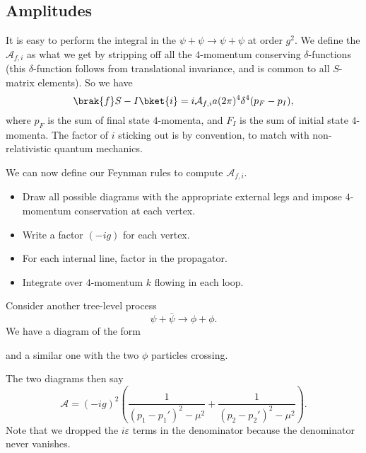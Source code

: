 \documentclass[a4paper]{article}
\begin{document}
\subsection{Amplitudes}
It is easy to perform the integral in the $\psi + \psi \to \psi + \psi$ at order $g^2$. We define the  $\mathcal{A}_{f,i}$ as what we get by stripping off all the $4$-momentum conserving $\delta$-functions (this $\delta$-function follows from translational invariance, and is common to all $S$-matrix elements). So we have
\[
  \brak{f}S - I\bket{i} = i \mathcal{A}_{f,i}a (2\pi)^4 \delta^4 (p_F - p_I),
\]
where $p_F$ is the sum of final state $4$-momenta, and $F_I$ is the sum of initial state $4$-momenta. The factor of $i$ sticking out is by convention, to match with non-relativistic quantum mechanics.

We can now define our Feynman rules to compute $\mathcal{A}_{f, i}$.

\begin{itemize}
  \item Draw all possible diagrams with the appropriate external legs and impose $4$-momentum conservation at each vertex.
  \item Write a factor $(-ig)$ for each vertex.
  \item For each internal line, factor in the propagator.
  \item Integrate over $4$-momentum $k$ flowing in each loop.
\end{itemize}

\begin{eg}
  Consider another tree-level process
  \[
    \psi + \bar{\psi} \to \phi + \phi.
  \]
  We have a diagram of the form
  \begin{center}
  \end{center}
  and a similar one with the two $\phi$ particles crossing.

  The two diagrams then say
  \[
    \mathcal{A} = (-ig)^2 \left(\frac{1}{(p_1 - p_1')^2 - \mu^2} + \frac{1}{(p_2 - p_2')^2 - \mu^2}\right).
  \]
  Note that we dropped the $i\varepsilon$ terms in the denominator because the denominator never vanishes.
\end{eg}
\end{document}
